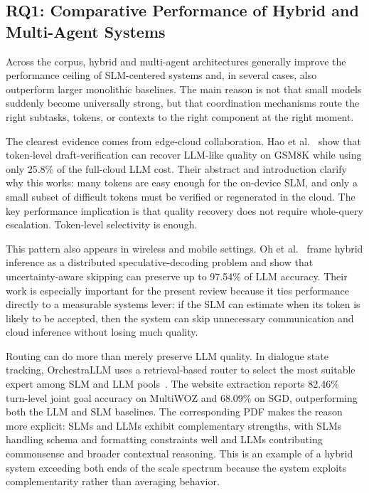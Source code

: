 \subsection{RQ1: Comparative Performance of Hybrid and Multi-Agent Systems}
Across the corpus, hybrid and multi-agent architectures generally improve the performance ceiling of SLM-centered systems and, in several cases, also outperform larger monolithic baselines. The main reason is not that small models suddenly become universally strong, but that coordination mechanisms route the right subtasks, tokens, or contexts to the right component at the right moment.

The clearest evidence comes from edge-cloud collaboration. Hao et al.~\cite{hao2024hybrid} show that token-level draft-verification can recover LLM-like quality on GSM8K while using only 25.8\% of the full-cloud LLM cost. Their abstract and introduction clarify why this works: many tokens are easy enough for the on-device SLM, and only a small subset of difficult tokens must be verified or regenerated in the cloud. The key performance implication is that quality recovery does not require whole-query escalation. Token-level selectivity is enough.

This pattern also appears in wireless and mobile settings. Oh et al.~\cite{oh2025uncertainty} frame hybrid inference as a distributed speculative-decoding problem and show that uncertainty-aware skipping can preserve up to 97.54\% of LLM accuracy. Their work is especially important for the present review because it ties performance directly to a measurable systems lever: if the SLM can estimate when its token is likely to be accepted, then the system can skip unnecessary communication and cloud inference without losing much quality.

Routing can do more than merely preserve LLM quality. In dialogue state tracking, OrchestraLLM uses a retrieval-based router to select the most suitable expert among SLM and LLM pools~\cite{lee2024orchestrallm}. The website extraction reports 82.46\% turn-level joint goal accuracy on MultiWOZ and 68.09\% on SGD, outperforming both the LLM and SLM baselines. The corresponding PDF makes the reason more explicit: SLMs and LLMs exhibit complementary strengths, with SLMs handling schema and formatting constraints well and LLMs contributing commonsense and broader contextual reasoning. This is an example of a hybrid system exceeding both ends of the scale spectrum because the system exploits complementarity rather than averaging behavior.


